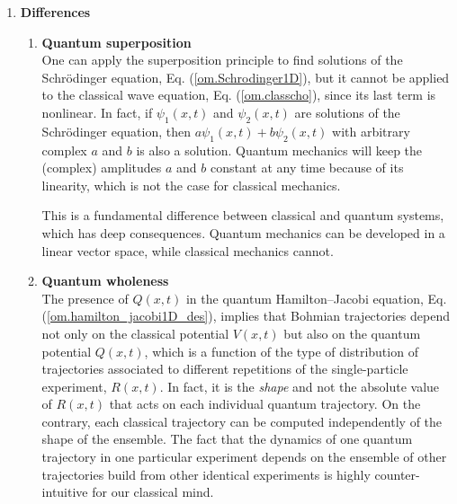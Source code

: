 \documentclass[nofootinbib, secnumarabic, amsmath, nobibnotes,10pt,aps,pra]{revtex4-1}
\newcommand{\eref}[1]{Eq. (\ref{#1})}
\begin{document}
\begin{enumerate}
\item \textbf{Differences}
\begin{enumerate}
\item \textbf{Quantum superposition} \\ One can apply the superposition principle to find solutions of the Schr\"odinger equation, \eref{om.Schrodinger1D}, but it cannot be applied to the classical wave equation, \eref{om.classcho}, since its last term is nonlinear. In fact, if $\psi_1(x,t)$ and $\psi_2(x,t)$ are solutions of the Schr\"odinger equation, then $a\psi_1(x,t) + b\psi_2(x,t)$ with arbitrary complex $a$ and $b$ is also a solution. Quantum mechanics will keep the (complex) amplitudes $a$ and $b$ constant at any time because of its linearity, which is not the case for classical mechanics.

{\quad}This is a fundamental difference between classical and quantum systems, which has deep consequences. Quantum mechanics can be developed in a linear vector space, while classical mechanics cannot.

\item \textbf{Quantum wholeness} \\ The presence of $Q(x,t)$ in the quantum Hamilton--Jacobi equation, \eref{om.hamilton_jacobi1D_des}, implies that Bohmian trajectories depend not only on the classical potential $V(x,t)$ but also on the quantum potential $Q(x,t)$, which is a function of the type of distribution of trajectories associated to different repetitions of the single-particle experiment, $R(x,t)$. In fact, it is the \textit{shape} and not the absolute value of $R(x,t)$ that acts on each individual quantum trajectory. On the contrary, each classical trajectory can be computed independently of the shape of the ensemble. The fact that the dynamics of one quantum trajectory in one particular experiment depends on the ensemble of other trajectories build from other identical experiments is highly counter-intuitive for our classical mind. 


\end{enumerate}
\end{enumerate}
\end{document}
